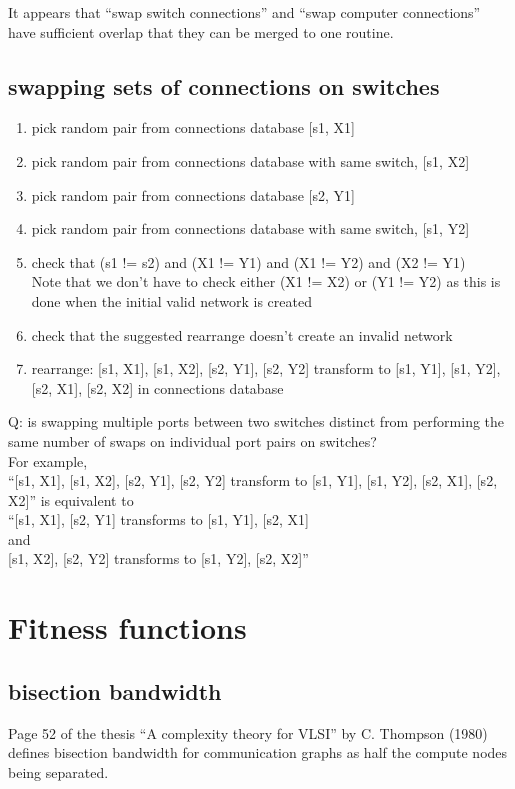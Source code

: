 \documentclass[pdftex]{article}
\begin{document}
It appears that ``swap switch connections'' and ``swap computer connections'' have sufficient overlap that they can be merged to one routine.

\subsection{swapping sets of connections on switches}

\begin{enumerate}
 \item pick random pair from connections database {[}s1, X1]
 \item pick random pair from connections database with same switch, {[}s1, X2]
 \item pick random pair from connections database {[}s2, Y1]
 \item pick random pair from connections database with same switch, {[}s1, Y2]
 \item check that (s1 != s2) and  (X1 != Y1) and (X1 != Y2) and (X2 != Y1)\\
 Note that we don't have to check either (X1 != X2) or (Y1 != Y2) as this is done when the initial valid network is created
 \item check that the suggested rearrange doesn't create an invalid network 
 \item rearrange: {[}s1, X1], {[}s1, X2], {[}s2, Y1], {[}s2, Y2] transform to {[}s1, Y1], {[}s1, Y2], {[}s2, X1], {[}s2, X2] in connections database
\end{enumerate}

Q: is swapping multiple ports between two switches distinct from performing the same number of swaps on individual port pairs on switches?\\
For example,\\
``{[}s1, X1], {[}s1, X2], {[}s2, Y1], {[}s2, Y2] transform to {[}s1, Y1], {[}s1, Y2], {[}s2, X1], {[}s2, X2]'' is equivalent to\\
``{[}s1, X1], {[}s2, Y1] transforms to {[}s1, Y1], {[}s2, X1]\\
and\\
{[}s1, X2], {[}s2, Y2] transforms to {[}s1, Y2], {[}s2, X2]''

\section{Fitness functions}

\subsection{bisection bandwidth}
Page 52 of the thesis ``A complexity theory for VLSI'' by C. Thompson (1980) defines bisection bandwidth for communication graphs as half the compute nodes being separated.
\end{document}
